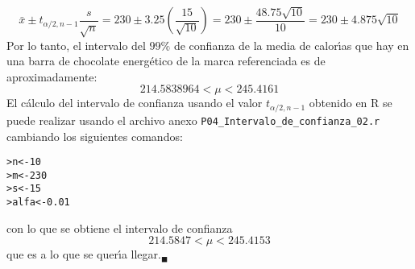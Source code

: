 \begin{solucion}
 \begin{equation*}
  \bar{x}\pm t_{\alpha/2,n-1}\frac{s}{\sqrt{n}} = 230\pm 3.25\left( \frac{15}{\sqrt{10}} \right) = 230 \pm \frac{48.75\sqrt{10}}{10} = 230 \pm 4.875\sqrt{10}
 \end{equation*}
 Por lo tanto, el intervalo del $99\%$ de confianza de la media de calor\'{\i}as que hay en una barra de chocolate energ\'etico de la marca referenciada es de aproximadamente:
 \begin{equation*}
  214.5838964 < \mu < 245.4161
 \end{equation*}
 El c\'alculo del intervalo de confianza usando el valor $t_{\alpha/2,n-1}$ obtenido en R se puede realizar usando el archivo anexo \texttt{P04\_Intervalo\_de\_confianza\_02.r} cambiando los siguientes comandos:
 \begin{verbatim}
>n<-10
>m<-230
>s<-15
>alfa<-0.01
 \end{verbatim}
 \vspace{-0.5cm}
 con lo que se obtiene el intervalo de confianza
 \begin{equation*}
  214.5847 < \mu < 245.4153
 \end{equation*}
 que es a lo que se quer\'{\i}a llegar.${}_{\blacksquare}$
\end{solucion}
